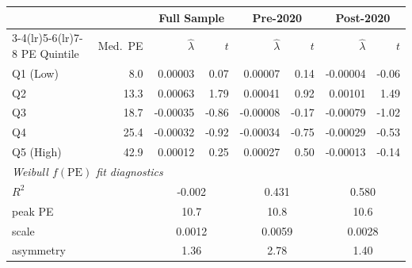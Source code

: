 \begin{tabular}{lrrrrrrr}
\toprule
& & \multicolumn{2}{c}{Full Sample} & \multicolumn{2}{c}{Pre-2020} & \multicolumn{2}{c}{Post-2020} \\
\cmidrule(lr){3-4}\cmidrule(lr){5-6}\cmidrule(lr){7-8}
PE Quintile & Med.\ PE & $\hat{\lambda}$ & $t$ & $\hat{\lambda}$ & $t$ & $\hat{\lambda}$ & $t$ \\
\midrule
Q1 (Low) & 8.0 & 0.00003 & 0.07 & 0.00007 & 0.14 & -0.00004 & -0.06 \\
Q2 & 13.3 & 0.00063 & 1.79 & 0.00041 & 0.92 & 0.00101 & 1.49 \\
Q3 & 18.7 & -0.00035 & -0.86 & -0.00008 & -0.17 & -0.00079 & -1.02 \\
Q4 & 25.4 & -0.00032 & -0.92 & -0.00034 & -0.75 & -0.00029 & -0.53 \\
Q5 (High) & 42.9 & 0.00012 & 0.25 & 0.00027 & 0.50 & -0.00013 & -0.14 \\
\midrule
\multicolumn{8}{l}{\textit{Weibull $f(\mathrm{PE})$ fit diagnostics}} \\
$R^2$ & & \multicolumn{2}{c}{-0.002} & \multicolumn{2}{c}{0.431} & \multicolumn{2}{c}{0.580} \\
peak PE & & \multicolumn{2}{c}{10.7} & \multicolumn{2}{c}{10.8} & \multicolumn{2}{c}{10.6} \\
scale & & \multicolumn{2}{c}{0.0012} & \multicolumn{2}{c}{0.0059} & \multicolumn{2}{c}{0.0028} \\
asymmetry & & \multicolumn{2}{c}{1.36} & \multicolumn{2}{c}{2.78} & \multicolumn{2}{c}{1.40} \\
\bottomrule
\end{tabular}